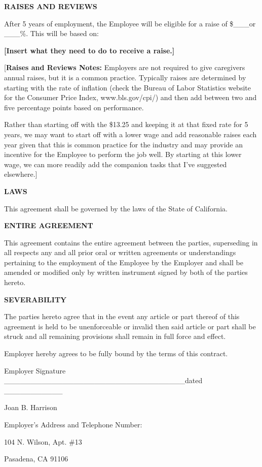 \documentclass[]{article}
\newcommand{\mom}{Joan B. Harrison}
\begin{document}
\textbf{RAISES AND REVIEWS}

After 5 years of employment, the Employee will be eligible for a raise
of \$\_\_\_or \_\_\_\%. This will be based on:

\textbf{{[}Insert what they need to do to receive a raise.{]}}

{[}\textbf{Raises and Reviews Notes:} Employers are not required to give
caregivers annual raises, but it is a common practice. Typically raises
are determined by starting with the rate of inflation (check the Bureau
of Labor Statistics website for the Consumer Price Index,
www.bls.gov/cpi/) and then add between two and five percentage points
based on performance.

Rather than starting off with the \$13.25 and keeping it at that fixed
rate for 5 years, we may want to start off with a lower wage and add
reasonable raises each year given that this is common practice for the
industry and may provide an incentive for the Employee to perform the
job well. By starting at this lower wage, we can more readily add the
companion tasks that I've suggested elsewhere.{]}

\textbf{LAWS}

This agreement shall be governed by the laws of the State of California.

\textbf{ENTIRE AGREEMENT}

This agreement contains the entire agreement between the parties,
superseding in all respects any and all prior oral or written agreements
or understandings pertaining to the employment of the Employee by the
Employer and shall be amended or modified only by written instrument
signed by both of the parties hereto.

\textbf{SEVERABILITY}

The parties hereto agree that in the event any article or part thereof
of this agreement is held to be unenforceable or invalid then said
article or part shall be struck and all remaining provisions shall
remain in full force and effect.

Employer hereby agrees to be fully bound by the terms of this contract.

Employer Signature
\_\_\_\_\_\_\_\_\_\_\_\_\_\_\_\_\_\_\_\_\_\_\_\_\_\_\_\_\_\_\_\_\_\_dated
\_\_\_\_\_\_\_\_\_\_\_

\mom{}

Employer's Address and Telephone Number:

104 N. Wilson, Apt. \#13

Pasadena, CA 91106
\end{document}
